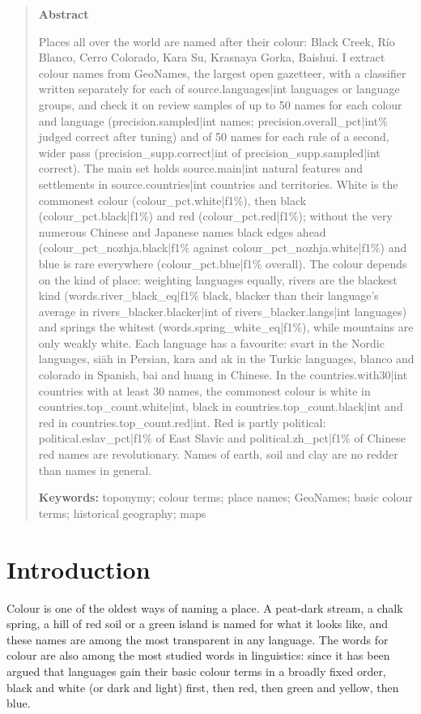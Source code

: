 \documentclass[11pt,a4paper]{article}
\begin{document}
\begin{quote}
\small
\begin{center}\textbf{Abstract}\end{center}
Places all over the world are named after their colour: Black Creek, Río Blanco, Cerro Colorado, Kara Su, Krasnaya Gorka, Baishui. I extract colour names from GeoNames, the largest open gazetteer, with a classifier written separately for each of {{source.languages|int}} languages or language groups, and check it on review samples of up to 50 names for each colour and language ({{precision.sampled|int}} names; {{precision.overall_pct|int}}\% judged correct after tuning) and of 50 names for each rule of a second, wider pass ({{precision_supp.correct|int}} of {{precision_supp.sampled|int}} correct). The main set holds {{source.main|int}} natural features and settlements in {{source.countries|int}} countries and territories. White is the commonest colour ({{colour_pct.white|f1}}\%), then black ({{colour_pct.black|f1}}\%) and red ({{colour_pct.red|f1}}\%); without the very numerous Chinese and Japanese names black edges ahead ({{colour_pct_nozhja.black|f1}}\% against {{colour_pct_nozhja.white|f1}}\%) and blue is rare everywhere ({{colour_pct.blue|f1}}\% overall). The colour depends on the kind of place: weighting languages equally, rivers are the blackest kind ({{words.river_black_eq|f1}}\% black, blacker than their language's average in {{rivers_blacker.blacker|int}} of {{rivers_blacker.langs|int}} languages) and springs the whitest ({{words.spring_white_eq|f1}}\%), while mountains are only weakly white. Each language has a favourite: svart in the Nordic languages, siāh in Persian, kara and ak in the Turkic languages, blanco and colorado in Spanish, bai and huang in Chinese. In the {{countries.with30|int}} countries with at least 30 names, the commonest colour is white in {{countries.top_count.white|int}}, black in {{countries.top_count.black|int}} and red in {{countries.top_count.red|int}}. Red is partly political: {{political.eslav_pct|f1}}\% of East Slavic and {{political.zh_pct|f1}}\% of Chinese red names are revolutionary. Names of earth, soil and clay are no redder than names in general.

\textbf{Keywords:} toponymy; colour terms; place names; GeoNames; basic colour terms; historical geography; maps
\end{quote}

\section{Introduction}
Colour is one of the oldest ways of naming a place. A peat-dark stream, a chalk spring, a hill of red soil or a green island is named for what it looks like, and these names are among the most transparent in any language. The words for colour are also among the most studied words in linguistics: since \citet{berlinkay} it has been argued that languages gain their basic colour terms in a broadly fixed order, black and white (or dark and light) first, then red, then green and yellow, then blue.
\end{document}
